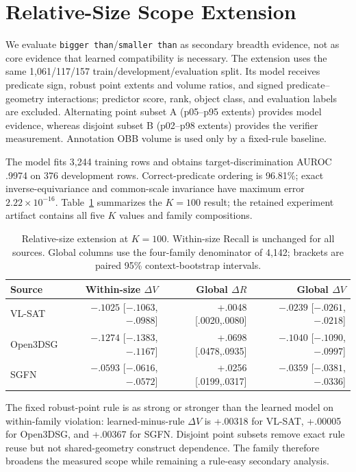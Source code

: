 \section{Relative-Size Scope Extension}

We evaluate \texttt{bigger than}/\texttt{smaller than} as secondary breadth
evidence, not as core evidence that learned compatibility is necessary. The
extension uses the same 1,061/117/157 train/development/evaluation split. Its model receives
predicate sign, robust point extents and volume ratios, and signed
predicate--geometry interactions; predictor score, rank, object class, and
evaluation labels are excluded. Alternating point subset A (p05--p95 extents)
provides model evidence, whereas disjoint subset B (p02--p98 extents) provides
the verifier measurement. Annotation OBB volume is used only by a fixed-rule
baseline.

The model fits 3,244 training rows and obtains target-discrimination AUROC .9974
on 376 development rows. Correct-predicate ordering is 96.81\%; exact
inverse-equivariance and common-scale invariance have maximum error
$2.22\times10^{-16}$. Table~\ref{tab:relative-size-summary} summarizes the
$K=100$ result; the retained experiment artifact contains all five $K$ values
and family compositions.

\begin{table}[t]
\centering
{\small
\setlength{\tabcolsep}{3.2pt}
\begin{tabular}{lrrr}
\toprule
Source & Within-size $\Delta V$ & Global $\Delta R$ & Global $\Delta V$ \\
\midrule
VL-SAT & $-.1025$ [$-.1063$,$-.0988$] & +.0048 [.0020,.0080] & $-.0239$ [$-.0261$,$-.0218$] \\
Open3DSG & $-.1274$ [$-.1383$,$-.1167$] & +.0698 [.0478,.0935] & $-.1040$ [$-.1090$,$-.0997$] \\
SGFN & $-.0593$ [$-.0616$,$-.0572$] & +.0256 [.0199,.0317] & $-.0359$ [$-.0381$,$-.0336$] \\
\bottomrule
\end{tabular}
}
\caption{Relative-size extension at $K=100$. Within-size Recall is unchanged
for all sources. Global columns use the four-family denominator of 4,142;
brackets are paired 95\% context-bootstrap intervals.}
\label{tab:relative-size-summary}
\end{table}

The fixed robust-point rule is as strong or stronger than the learned model on
within-family violation: learned-minus-rule $\Delta V$ is +.00318 for VL-SAT,
+.00005 for Open3DSG, and +.00367 for SGFN. Disjoint point subsets remove exact
rule reuse but not shared-geometry construct dependence. The family therefore
broadens the measured scope while remaining a rule-easy secondary analysis.
